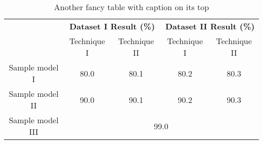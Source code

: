 \begin{table}[!htbp]
  \begin{center}
    \caption{Another fancy table with caption on its top}
    \label{table4}
    \begin{tabular}{|c|c|c|c|c|} 
    \hline
      & \multicolumn{2}{c|}{\textbf{Dataset I Result (\%)}} & \multicolumn{2}{c|}{\textbf{Dataset II Result (\%)}}\\ \cline{2-5}
      & Technique I & Technique II & Technique I & Technique II \\ 
      \hline \hline
        Sample model I & 80.0 & 80.1 & 80.2 & 80.3\\ \hline
        Sample model II  & 90.0 & 90.1 & 90.2 & 90.3\\ \hline
        Sample model III & \multicolumn{4}{c|}{99.0}\\
    \hline
    \end{tabular}
  \end{center}
\end{table}
